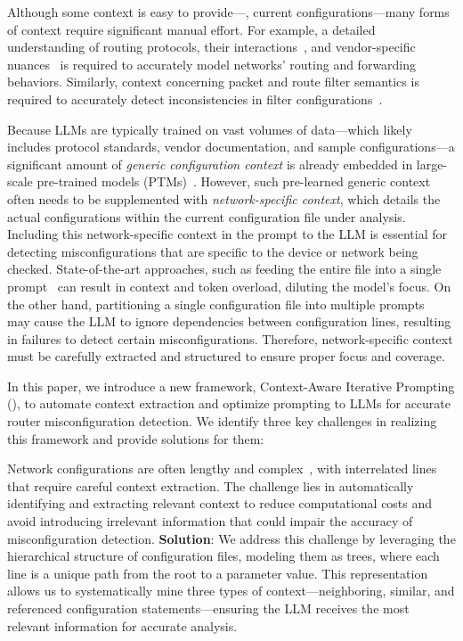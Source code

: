 Although some context is easy to provide---\eg, current
config\-urations---many forms of context require significant manual effort.
For example, a detailed understanding of routing protocols, their
interactions~\cite{le2007rr}, and vendor-specific nuances~\cite{ye2020hoyan}
is required to accurately model networks' routing and forwarding behaviors.
Similarly, context concerning packet and route filter semantics is required to
accurately detect inconsistencies in filter
configurations~\cite{kakarla2020finding}.

Because LLMs are typically trained on vast volumes of data---which likely
includes protocol standards, vendor documentation, and sample
configurations---a significant amount of \textit{generic configuration
context} is already embedded in large-scale pre-trained models
(PTMs)~\cite{qiu2020pre}. However, such pre-learned generic context often
needs to be supplemented with \textit{network-specific context}, which details
the actual configurations within the current configuration file under
analysis. Including this network-specific context in the prompt to the LLM is essential
for detecting misconfigurations that are specific to the device or network
being checked. State-of-the-art 
approaches, such as feeding the entire file into a single
prompt~\cite{lican,li2024long} can result in context and token overload,
diluting the model's focus. On the other hand, partitioning a single
configuration file into multiple
prompts~\cite{lian2023configuration,chen2024automatic,wang2024identifying}
may cause the LLM to ignore dependencies between configuration lines,
resulting in failures to detect certain misconfigurations.
Therefore, network-specific context must be carefully extracted and
structured to ensure proper focus and coverage.

In this paper, we introduce a new framework, Context-Aware Iterative Prompting
(\sysname{}), to automate context extraction and optimize prompting to LLMs
for accurate router misconfiguration detection. We identify three key
challenges in realizing this framework and provide solutions for them:

 Network
configurations are often lengthy and
complex~\cite{benson2009complexitymetrics}, with interrelated lines that
require careful context extraction. The challenge lies in automatically
identifying and extracting relevant context to reduce computational costs and
avoid introducing irrelevant information that could impair the accuracy of
misconfiguration detection. \textbf{Solution}: We address this challenge by
leveraging the hierarchical structure of configuration files, modeling them as
trees, where each line is a unique path from the root to a parameter value.
This representation allows us to systematically mine three types of
context---neighboring, similar, and referenced configuration
statements---ensuring the LLM receives the most relevant information for
accurate analysis.

